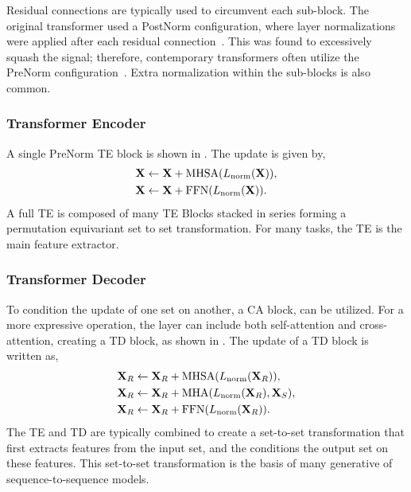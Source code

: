 Residual connections are typically used to circumvent each sub-block.
The original transformer used a PostNorm configuration, where layer normalizations were applied after each residual connection~\cite{Attention}.
This was found to excessively squash the signal; therefore, contemporary transformers often utilize the \Gls{PreNorm} configuration~\cite{PreLN}.
Extra normalization within the sub-blocks is also common.


\subsubsection{Transformer Encoder}

A single PreNorm \Gls{TE} block is shown in .
The update is given by,
\begin{equation}
    \begin{aligned}
        \mathbf{X} & \leftarrow \mathbf{X} + \text{MHSA}(L_\text{norm}(\mathbf{X})), \\
        \mathbf{X} & \leftarrow \mathbf{X} + \text{FFN}(L_\text{norm}(\mathbf{X})).
    \end{aligned}
\end{equation}
A full \Gls{TE} is composed of many \Gls{TE} Blocks stacked in series forming a permutation equivariant set to set transformation.
For many tasks, the \Gls{TE} is the main feature extractor.

\subsubsection{Transformer Decoder}

To condition the update of one set on another, a \Gls{CA} block, can be utilized.
For a more expressive operation, the layer can include both self-attention and cross-attention, creating a \Gls{TD} block, as shown in .
The update of a \Gls{TD} block is written as,
\begin{equation}
    \begin{aligned}
        \mathbf{X}_R & \leftarrow \mathbf{X}_R + \text{MHSA}(L_\text{norm}(\mathbf{X}_R)),      \\
        \mathbf{X}_R & \leftarrow \mathbf{X}_R + \text{MHA}(L_\text{norm}(\mathbf{X}_R), \mathbf{X}_S), \\
        \mathbf{X}_R & \leftarrow \mathbf{X}_R + \text{FFN}(L_\text{norm}(\mathbf{X}_R)).
    \end{aligned}
\end{equation}
The \Gls{TE} and \Gls{TD} are typically combined to create a set-to-set transformation that first extracts features from the input set, and the conditions the output set on these features.
This set-to-set transformation is the basis of many generative of sequence-to-sequence models.

